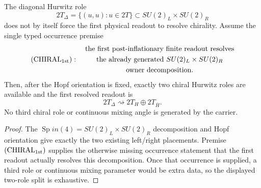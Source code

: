 \documentclass[12pt,a4paper]{article}
\begin{document}
\begin{theorem}
\label{p8:post:inflationary-chiral-separation}
The diagonal Hurwitz role
\[
2T_\Delta=\{(u,u):u\in2T\}\subset SU(2)_L\times SU(2)_R
\]
does not by itself force the first physical readout to resolve chirality.
Assume the single typed occurrence premise
\begin{equation}
\label{p8:eq:chirality-readout-premise}
(\mathrm{CHIRAL}_{\rm 1st}):\quad
 \begin{gathered}
 \text{the first post-inflationary finite readout resolves}\\
 \text{the already generated } SU(2)_L\times SU(2)_R\\
 \text{owner decomposition.}
 \end{gathered}
\end{equation}
Then, after the Hopf orientation is fixed, exactly two chiral Hurwitz roles are
available and the first resolved readout is
\[
2T_\Delta\rightsquigarrow2T_H\oplus2T_{\bar H}.
\]
No third chiral role or continuous mixing angle is generated by the carrier.
\end{theorem}

\begin{proof}
The \(\operatorname{Sp}in(4)=SU(2)_L\times SU(2)_R\) decomposition and Hopf orientation give
exactly the two existing left/right placements.  Premise
\((\mathrm{CHIRAL}_{\rm 1st})\) supplies the otherwise missing occurrence
statement that the first readout actually resolves this decomposition.  Once
that occurrence is supplied, a third role or continuous mixing parameter would
be extra data, so the displayed two-role split is exhaustive.
\end{proof}
\end{document}
